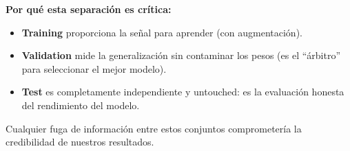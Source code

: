 \documentclass[11pt,a4paper]{article}
\begin{document}
\textbf{Por qué esta separación es crítica:}
\begin{itemize}
    \item \textbf{Training} proporciona la señal para aprender (con augmentación).
    \item \textbf{Validation} mide la generalización sin contaminar los pesos (es el ``árbitro'' para seleccionar el mejor modelo).
    \item \textbf{Test} es completamente independiente y untouched: es la evaluación honesta del rendimiento del modelo.
\end{itemize}

Cualquier fuga de información entre estos conjuntos comprometería la credibilidad de nuestros resultados.

\begin{figure}[H]
\centering
{}
\end{figure}
\end{document}
